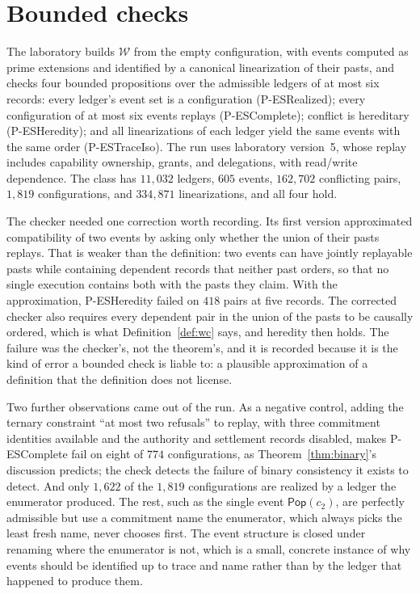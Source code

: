 \documentclass[11pt,openany]{book}
\theoremstyle{remark}
\newcommand{\Pop}{\mathsf{Pop}}
\begin{document}
\section{Bounded checks}

The laboratory builds $\mathcal W$ from the empty configuration, with
events computed as prime extensions and identified by a canonical
linearization of their pasts, and checks four bounded propositions over
the admissible ledgers of at most six records: every ledger's event set
is a configuration (P-ESRealized); every configuration of at most six
events replays (P-ESComplete); conflict is hereditary (P-ESHeredity); and
all linearizations of each ledger yield the same events with the same
order (P-ESTraceIso). The run uses laboratory version~5, whose replay
includes capability ownership, grants, and delegations, with read/write
dependence. The class has $11{,}032$ ledgers, $605$ events, $162{,}702$
conflicting pairs, $1{,}819$ configurations, and $334{,}871$
linearizations, and all four hold.

The checker needed one correction worth recording. Its first version
approximated compatibility of two events by asking only whether the union
of their pasts replays. That is weaker than the definition: two events
can have jointly replayable pasts while containing dependent records that
neither past orders, so that no single execution contains both with the
pasts they claim. With the approximation, P-ESHeredity failed on $418$
pairs at five records. The corrected checker also requires every
dependent pair in the union of the pasts to be causally ordered, which is
what Definition~\ref{def:wc} says, and heredity then holds. The failure
was the checker's, not the theorem's, and it is recorded because it is the
kind of error a bounded check is liable to: a plausible approximation of a
definition that the definition does not license.

Two further observations came out of the run. As a negative control,
adding the ternary constraint ``at most two refusals'' to replay, with
three commitment identities available and the authority and settlement
records disabled, makes P-ESComplete fail on eight of $774$
configurations, as Theorem~\ref{thm:binary}'s discussion predicts; the
check detects the failure of binary consistency it exists to detect. And
only $1{,}622$ of the $1{,}819$ configurations are realized by a ledger the
enumerator produced. The rest, such as the single event $\Pop(c_2)$, are
perfectly admissible but use a commitment name the enumerator, which
always picks the least fresh name, never chooses first. The event
structure is closed under renaming where the enumerator is not, which is
a small, concrete instance of why events should be identified up to trace
and name rather than by the ledger that happened to produce them.
\end{document}
